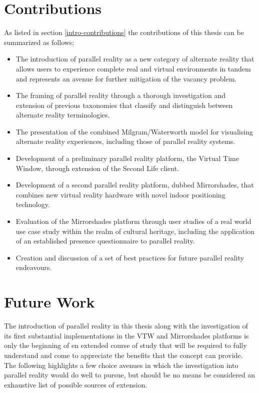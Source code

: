 
\section{Contributions}

As listed in section \ref{intro-contributions} the contributions of this thesis can be summarized as follows;

\begin{itemize}
	\item The introduction of parallel reality as a new category of alternate reality that allows users to experience complete real and virtual environments in tandem and represents an avenue for further mitigation of the vacancy problem.
	\item The framing of parallel reality through a thorough investigation and extension of previous taxonomies that classify and distinguish between alternate reality terminologies.
	\item The presentation of the combined Milgram/Waterworth model for visualising alternate reality experiences, including those of parallel reality systems.
	\item Development of a preliminary parallel reality platform, the Virtual Time Window, through extension of the Second Life client.
	\item Development of a second parallel reality platform, dubbed Mirrorshades, that combines new virtual reality hardware with novel indoor positioning technology.
	\item Evaluation of the Mirrorshades platform through user studies of a real world use case study within the realm of cultural heritage, including the application of an established presence questionnaire to parallel reality.
	\item Creation and discussion of a set of best practices for future parallel reality endeavours.
\end{itemize}


\section{Future Work}

The introduction of parallel reality in this thesis along with the investigation of its first substantial implementations in the VTW and Mirrorshades platforms is only the beginning of en extended course of study that will be required to fully understand and come to appreciate the benefits that the concept can provide. The following highlights a few choice avenues in which the investigation into parallel reality would do well to pursue, but should be no means be considered an exhaustive list of possible sources of extension.

